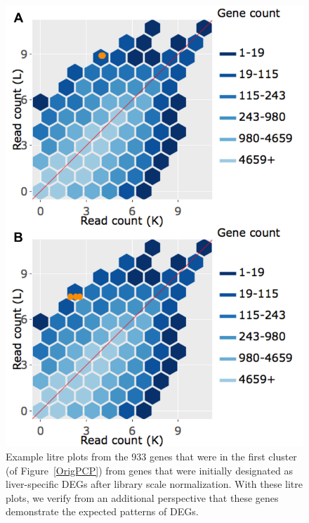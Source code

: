 \documentclass{article}
\begin{document}
\null
\begin{figure}[t!]
\centerline{\includegraphics[width=0.7\columnwidth]{../MakeFigures/Dashboards/litreClusterOrig/litreClusterOrig.jpg}}
\caption{Example litre plots from the 933 genes that were in the first cluster (of Figure~\ref{OrigPCP}) from genes that were initially designated as liver-specific DEGs after library scale normalization. With these litre plots, we verify from an additional perspective that these genes demonstrate the expected patterns of DEGs.
\label{litreClusterOrig}}
\end{figure}
\end{document}
